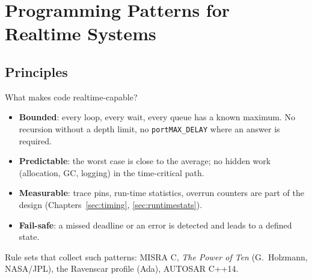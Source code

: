 \section{Programming Patterns for Realtime Systems}
\label{sec:patterns}
\scriptonly{\sloppy}

\subsection{Principles}
\begin{frame}{What makes code realtime-capable?}
  \begin{itemize}
    \item \textbf{Bounded}: every loop, every wait, every queue has a known maximum. No recursion without a depth limit, no \texttt{portMAX\_DELAY} where an answer is required.
    \item \textbf{Predictable}: the worst case is close to the average; no hidden work (allocation, GC, logging) in the time-critical path.
    \item \textbf{Measurable}: trace pins, run-time statistics, overrun counters are part of the design (Chapters~\ref{sec:timing}, \ref{sec:runtimestats}).
    \item \textbf{Fail-safe}: a missed deadline or an error is detected and leads to a defined state.
  \end{itemize}
  Rule sets that collect such patterns: MISRA C, \emph{The Power of Ten} (G.\ Holzmann, NASA/JPL), the Ravenscar profile (Ada), AUTOSAR C++14.
\end{frame}


